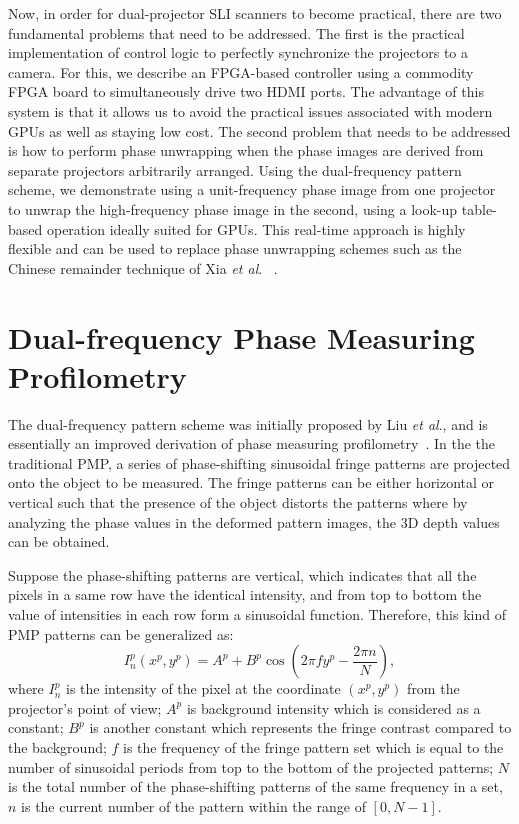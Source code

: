 \documentclass[]{spie}  %
\begin{document}
Now, in order for dual-projector SLI scanners to become practical, there are two fundamental problems that need to be addressed.  The first is the practical implementation of control logic to perfectly synchronize the projectors to a camera.  For this, we describe an FPGA-based controller using a commodity FPGA board to simultaneously drive two HDMI ports.  The advantage of this system is that it allows us to avoid the practical issues associated with modern GPUs as well as staying low cost.  The second problem that needs to be addressed is how to perform phase unwrapping when the phase images are derived from separate projectors arbitrarily arranged.  Using the dual-frequency pattern scheme, we demonstrate using a unit-frequency phase image from one projector to unwrap the high-frequency phase image in the second, using a look-up table-based operation ideally suited for GPUs. This real-time approach is highly flexible and can be used to replace phase unwrapping schemes such as the Chinese remainder technique of Xia \textit{et al}. ~\cite{xiax07}.

\section{Dual-frequency Phase Measuring Profilometry}
The dual-frequency pattern scheme was initially proposed by Liu \textit{et al}.\cite{liuk10}, and is essentially an improved derivation of phase measuring profilometry~\cite{hali89}. In the the traditional PMP, a series of phase-shifting sinusoidal fringe patterns are projected onto the object to be measured.  The fringe patterns can be either horizontal or vertical such that the presence of the object distorts the patterns where by analyzing the phase values in the deformed pattern images, the 3D depth values can be obtained.

Suppose the phase-shifting patterns are vertical, which indicates that all the pixels in a same row have the identical intensity, and from top to bottom the value of intensities in each row form a sinusoidal function. Therefore, this kind of PMP patterns can be generalized as:
\begin{equation} \label{eq:1.1}
I^p_n(x^p, y^p) = A^p + B^p\cos\left(2\pi f y^p - \frac{2\pi n}{N}\right),
\end{equation}
where $I^p_n$ is the intensity of the pixel at the coordinate $(x^p, y^p)$ from the projector's point of view; $A^p$ is background intensity which is considered as a constant; $B^p$ is another constant which represents the fringe contrast compared to the background; $f$ is the frequency of the fringe pattern set which is equal to the number of sinusoidal periods from top to the bottom of the projected patterns; $N$ is the total number of the phase-shifting patterns of the same frequency in a set, $n$ is the current number of the pattern within the range of $[0, N-1]$.
\end{document}
